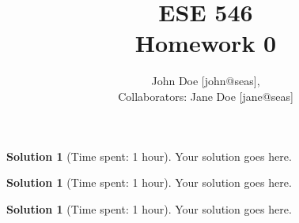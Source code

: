 \documentclass[11pt, reqno, letterpaper, twoside]{amsart}
\title{ESE 546\\[0.1in]
Homework 0}
\author{
John Doe [john@seas],\\
Collaborators: Jane Doe [jane@seas]
}
\theoremstyle{plain}
\theoremstyle{definition}
\newtheorem{solution}[theorem]{Solution}
\begin{document}
\maketitle

\begin{solution}[Time spent: 1 hour]

Your solution goes here.
\end{solution}

\clearpage
\begin{solution}[Time spent: 1 hour]
Your solution goes here.
\end{solution}

\clearpage
\begin{solution}[Time spent: 1 hour]
Your solution goes here.
\end{solution}
\end{document}
